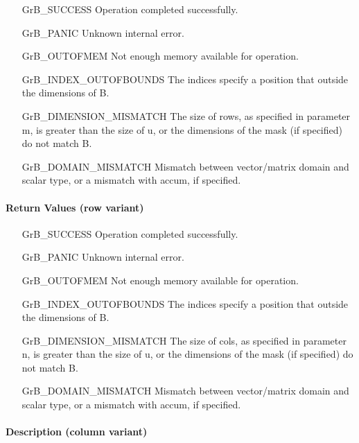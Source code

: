 \begin{itemize}[leftmargin=2.1in]
\item[{\sf GrB\_SUCCESS}]             Operation completed successfully.
\item[{\sf GrB\_PANIC}]               Unknown internal error.
\item[{\sf GrB\_OUTOFMEM}]            Not enough memory available for operation.
\item[{\sf GrB\_INDEX\_OUTOFBOUNDS}]  The indices specify a position that outside the dimensions of {\sf B}.
\item[{\sf GrB\_DIMENSION\_MISMATCH}] 
        The size of {\sf rows}, as specified in parameter {\sf m}, is greater than the size of {\sf u}, or
        the dimensions of the mask (if specified) do not match {\sf B}.
\item[{\sf GrB\_DOMAIN\_MISMATCH}]    Mismatch between vector/matrix domain and scalar type,
                                      or a mismatch with {\sf accum}, if specified.
\end{itemize}

\paragraph{Return Values (row variant)}

\begin{itemize}[leftmargin=2.1in]
\item[{\sf GrB\_SUCCESS}]             Operation completed successfully.
\item[{\sf GrB\_PANIC}]               Unknown internal error.
\item[{\sf GrB\_OUTOFMEM}]            Not enough memory available for operation.
\item[{\sf GrB\_INDEX\_OUTOFBOUNDS}]  The indices specify a position that outside the dimensions of {\sf B}.
\item[{\sf GrB\_DIMENSION\_MISMATCH}] 
        The size of {\sf cols}, as specified in parameter {\sf n}, is greater than the size of {\sf u}, or
        the dimensions of the mask (if specified) do not match {\sf B}.
\item[{\sf GrB\_DOMAIN\_MISMATCH}]    Mismatch between vector/matrix domain and scalar type,
                                      or a mismatch with {\sf accum}, if specified.
\end{itemize}

\paragraph{Description (column variant)}

